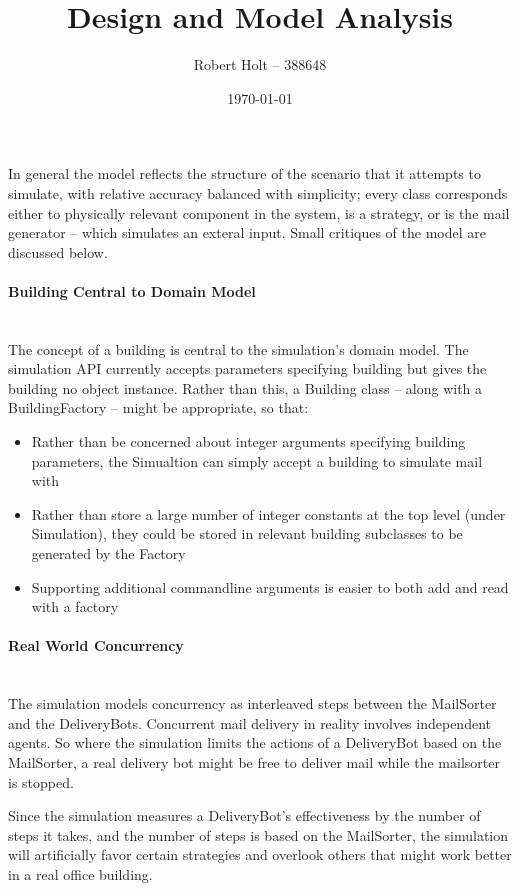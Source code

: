 \documentclass[12pt,oneside,a4paper]{article}
\begin{document}
\title{Design and Model Analysis}
\date{\today}
\author{Robert Holt -- 388648}

\maketitle

In general the model reflects the structure of the scenario that it
attempts to simulate, with relative accuracy balanced with simplicity;
every class corresponds either to physically relevant component in the
system, is a strategy, or is the mail generator -- which simulates an
exteral input. Small critiques of the model are discussed below.

\paragraph{Building Central to Domain Model}\mbox{}\\
The concept of a building is central to the simulation's domain model. The
simulation API currently accepts parameters specifying building but gives
the building no object instance. Rather than this, a Building class -- along
with a BuildingFactory -- might be appropriate, so that:
\begin{itemize}
  \item
  Rather than be concerned about integer arguments specifying
  building parameters, the Simualtion can simply accept a
  building to simulate mail with
  \item
  Rather than store a large number of integer constants at the
  top level (under Simulation), they could be stored in
  relevant building subclasses to be generated by the Factory
  \item 
  Supporting additional commandline arguments is easier to
  both add and read with a factory
\end{itemize}

\paragraph{Real World Concurrency}\mbox{}\\
The simulation models concurrency as interleaved steps between the
MailSorter and the DeliveryBots. Concurrent mail delivery in reality
involves independent agents. So where the simulation limits the actions
of a DeliveryBot based on the MailSorter, a real delivery bot might be
free to deliver mail while the mailsorter is stopped.

Since the simulation measures a DeliveryBot's effectiveness by the number of
steps it takes, and the number of steps is based on the MailSorter, the
simulation will artificially favor certain strategies and overlook others
that might work better in a real office building.
\end{document}
